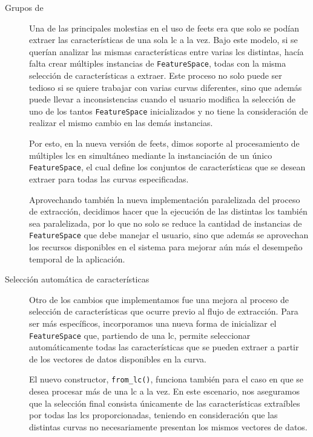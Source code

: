 \begin{description}
    \item[Grupos de ] Una de las principales molestias en el uso de \gls{feets} era que solo se podían extraer las características de una sola \gls{lc} a la vez. Bajo este modelo, si se querían analizar las mismas características entre varias \glspl{lc} distintas, hacía falta crear múltiples instancias de \texttt{FeatureSpace}, todas con la misma selección de características a extraer. Este proceso no solo puede ser tedioso si se quiere trabajar con varias curvas diferentes, sino que además puede llevar a inconsistencias cuando el usuario modifica la selección de uno de los tantos \texttt{FeatureSpace} inicializados y no tiene la consideración de realizar el mismo cambio en las demás instancias.
    
    Por esto, en la nueva versión de \gls{feets}, dimos soporte al procesamiento de múltiples \glspl{lc} en simultáneo mediante la instanciación de un único \texttt{FeatureSpace}, el cual define los conjuntos de características que se desean extraer para todas las curvas especificadas. 

    Aprovechando también la nueva implementación paralelizada del proceso de extracción, decidimos hacer que la ejecución de las distintas \glspl{lc} también sea paralelizada, por lo que no solo se reduce la cantidad de instancias de \texttt{FeatureSpace} que debe manejar el usuario, sino que además se aprovechan los recursos disponibles en el sistema para mejorar aún más el desempeño temporal de la aplicación. 
    
    \item[Selección automática de características] Otro de los cambios que implementamos fue una mejora al proceso de selección de características que ocurre previo al flujo de extracción. Para ser más específicos, incorporamos una nueva forma de inicializar el \texttt{Fea\-ture\-Space} que, partiendo de una \gls{lc}, permite seleccionar automáticamente todas las características que se pueden extraer a partir de los vectores de datos disponibles en la curva.
    
    El nuevo constructor, \texttt{from\_lc()}, funciona también para el caso en que se desea procesar más de una \gls{lc} a la vez. En este escenario, nos aseguramos que la selección final consista únicamente de las características extraíbles por todas las \glspl{lc} proporcionadas, teniendo en consideración que las distintas curvas no necesariamente presentan los mismos vectores de datos.
    

\end{description}
